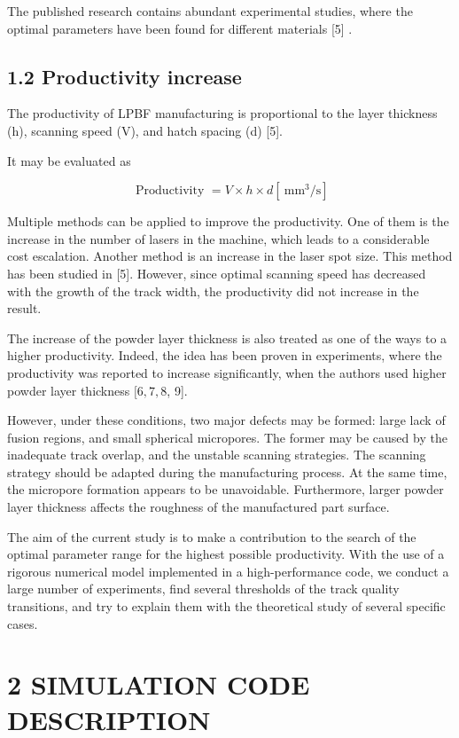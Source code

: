 \documentclass[10pt]{article}
\begin{document}
The published research contains abundant experimental studies, where the optimal parameters have been found for different materials [5] .

\subsection*{1.2 Productivity increase}
The productivity of LPBF manufacturing is proportional to the layer thickness (h), scanning speed (V), and hatch spacing (d) [5].

It may be evaluated as


\begin{equation*}
\text { Productivity }=V \times h \times d\left[\mathrm{~mm}^{3} / \mathrm{s}\right] \tag{1}
\end{equation*}


Multiple methods can be applied to improve the productivity. One of them is the increase in the number of lasers in the machine, which leads to a considerable cost escalation. Another method is an increase in the laser spot size. This method has been studied in [5]. However, since optimal scanning speed has decreased with the growth of the track width, the productivity did not increase in the result.

The increase of the powder layer thickness is also treated as one of the ways to a higher productivity. Indeed, the idea has been proven in experiments, where the productivity was reported to increase significantly, when the authors used higher powder layer thickness $[6,7,8$, 9].

However, under these conditions, two major defects may be formed: large lack of fusion regions, and small spherical micropores. The former may be caused by the inadequate track overlap, and the unstable scanning strategies. The scanning strategy should be adapted during the manufacturing process. At the same time, the micropore formation appears to be unavoidable. Furthermore, larger powder layer thickness affects the roughness of the manufactured part surface.

The aim of the current study is to make a contribution to the search of the optimal parameter range for the highest possible productivity. With the use of a rigorous numerical model implemented in a high-performance code, we conduct a large number of experiments, find several thresholds of the track quality transitions, and try to explain them with the theoretical study of several specific cases.

\section*{2 SIMULATION CODE DESCRIPTION}
\end{document}
